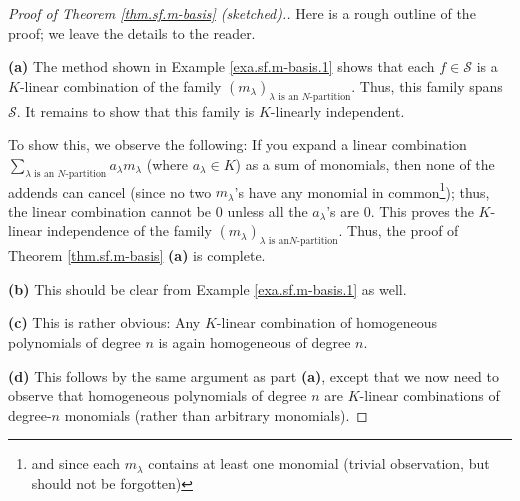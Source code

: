 \begin{proof}
[Proof of Theorem \ref{thm.sf.m-basis} (sketched).]Here is a rough outline of
the proof; we leave the details to the reader. \medskip

\textbf{(a)} The method shown in Example \ref{exa.sf.m-basis.1} shows that
each $f\in\mathcal{S}$ is a $K$-linear combination of the family $\left(
m_{\lambda}\right)  _{\lambda\text{ is an }N\text{-partition}}$. Thus, this
family spans $\mathcal{S}$. It remains to show that this family is
$K$-linearly independent.

To show this, we observe the following: If you expand a linear combination
$\sum\limits_{\lambda\text{ is an }N\text{-partition}}a_{\lambda}m_{\lambda}$
(where $a_{\lambda}\in K$) as a sum of monomials, then none of the addends can
cancel (since no two $m_{\lambda}$'s have any monomial in common\footnote{and
since each $m_{\lambda}$ contains at least one monomial (trivial observation,
but should not be forgotten)}); thus, the linear combination cannot be $0$
unless all the $a_{\lambda}$'s are $0$. This proves the $K$-linear
independence of the family $\left(  m_{\lambda}\right)  _{\lambda\text{ is an
}N\text{-partition}}$. Thus, the proof of Theorem \ref{thm.sf.m-basis}
\textbf{(a)} is complete. \medskip

\textbf{(b)} This should be clear from Example \ref{exa.sf.m-basis.1} as well.
\medskip

\textbf{(c)} This is rather obvious: Any $K$-linear combination of homogeneous
polynomials of degree $n$ is again homogeneous of degree $n$. \medskip

\textbf{(d)} This follows by the same argument as part \textbf{(a)}, except
that we now need to observe that homogeneous polynomials of degree $n$ are
$K$-linear combinations of degree-$n$ monomials (rather than arbitrary monomials).
\end{proof}

